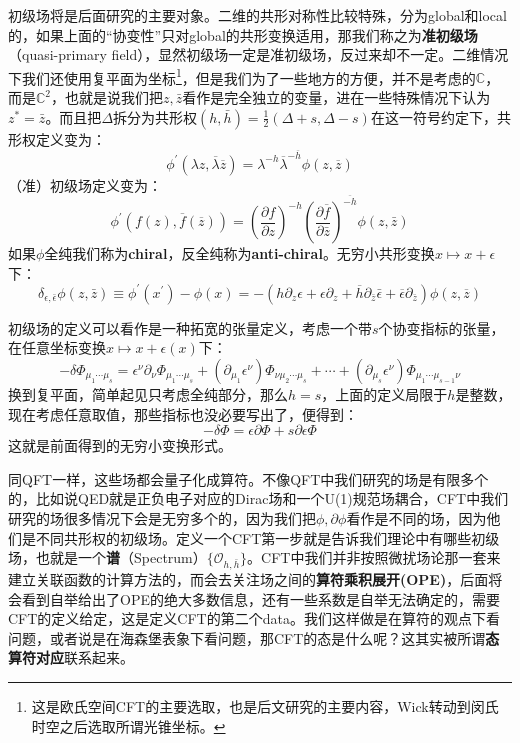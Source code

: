 初级场将是后面研究的主要对象。二维的共形对称性比较特殊，分为global和local的，如果上面的“协变性”只对global的共形变换适用，那我们称之为\textbf{准初级场}（quasi-primary field），显然初级场一定是准初级场，反过来却不一定。二维情况下我们还使用复平面为坐标\footnote{这是欧氏空间CFT的主要选取，也是后文研究的主要内容，Wick转动到闵氏时空之后选取所谓光锥坐标。}，但是我们为了一些地方的方便，并不是考虑的$\mathbb{C}$，而是$\mathbb{C}^2$，也就是说我们把$z,\bar z$看作是完全独立的变量，进在一些特殊情况下认为$z^*=\bar z$。而且把$\Delta$拆分为共形权$(h,\bar h)=\frac{1}{2}\left(\Delta+s,\Delta-s\right)$在这一符号约定下，共形权定义变为：
\begin{equation}
	\boxed{
	\phi^{\prime}(\lambda z,\overline{\lambda}\overline{z})=\lambda^{-h}\overline{\lambda}^{-\overline{h}}\phi(z,\overline{z})
	}
\end{equation}
（准）初级场定义变为：
\begin{equation}
	\boxed{
		\phi^{\prime}\left(f(z),\overline{f}(\overline{z})\right)=\left(\frac{\partial f}{\partial z}\right)^{-h}\left(\frac{\partial\overline{f}}{\partial\bar{z}}\right)^{\overline{-h}}\phi(z,\bar{z})
	}
\end{equation}
如果$\phi$全纯我们称为\textbf{chiral}，反全纯称为\textbf{anti-chiral}。无穷小共形变换$x\mapsto x+\epsilon$下：
\begin{equation}\label{ict}
	\boxed{
	\delta_{\epsilon,\bar{\epsilon}}\phi(z,\bar{z})\equiv\phi^\prime(x^\prime)-\phi(x)=-\left(h\partial_z\epsilon+\epsilon\partial_z+\overline{h}\partial_{\bar{z}}\bar{\epsilon}+\overline{\epsilon}\partial_{\bar{z}}\right)\phi(z,\overline{z})
	}
\end{equation}
\begin{remark}
	初级场的定义可以看作是一种拓宽的张量定义，考虑一个带$s$个协变指标的张量，在任意坐标变换$x\mapsto x+\epsilon(x)$下：
	\[-\delta\Phi_{\mu_1\cdots\mu_s}=\epsilon^\nu\partial_\nu\Phi_{\mu_1\cdots\mu_s}+(\partial_{\mu_1}\epsilon^\nu)\Phi_{\nu\mu_2\cdots\mu_s}+\cdots+(\partial_{\mu_s}\epsilon^\nu)\Phi_{\mu_1\cdots\mu_{s-1}\nu}\]
	换到复平面，简单起见只考虑全纯部分，那么$h=s$，上面的定义局限于$h$是整数，现在考虑任意取值，那些指标也没必要写出了，便得到：
	\[-\delta\Phi=\epsilon\partial\Phi+s\partial \epsilon\Phi\]
	这就是前面得到的无穷小变换形式。
\end{remark}

同QFT一样，这些场都会量子化成算符。不像QFT中我们研究的场是有限多个的，比如说QED就是正负电子对应的Dirac场和一个U(1)规范场耦合，CFT中我们研究的场很多情况下会是无穷多个的，因为我们把$\phi,\partial\phi$看作是不同的场，因为他们是不同共形权的初级场。定义一个CFT第一步就是告诉我们理论中有哪些初级场，也就是一个\textbf{谱}（Spectrum）$\{\mathcal{O}_{h,\bar h}\}$。CFT中我们并非按照微扰场论那一套来建立关联函数的计算方法的，而会去关注场之间的\textbf{算符乘积展开(OPE)}，后面将会看到自举给出了OPE的绝大多数信息，还有一些系数是自举无法确定的，需要CFT的定义给定，这是定义CFT的第二个data。我们这样做是在算符的观点下看问题，或者说是在海森堡表象下看问题，那CFT的态是什么呢？这其实被所谓\textbf{态算符对应}联系起来。

